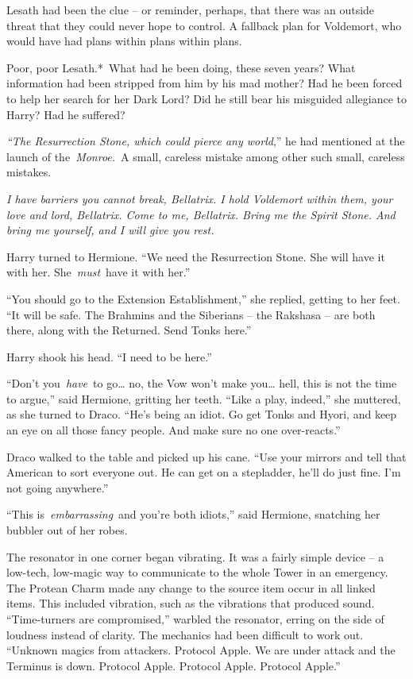Lesath had been the clue -- or reminder, perhaps, that there was an
outside threat that they could never hope to control. A fallback plan
for Voldemort, who would have had plans within plans within plans.

Poor, poor Lesath.*~What had he been doing, these seven years? What
information had been stripped from him by his mad mother? Had he been
forced to help her search for her Dark Lord? Did he still bear his
misguided allegiance to Harry? Had he suffered?

\emph{``The Resurrection Stone, which could pierce any world},'' he had
mentioned at the launch of the~\emph{Monroe.}~A small, careless mistake
among other such small, careless mistakes.

\emph{I have barriers you cannot break, Bellatrix. I hold Voldemort
within them, your love and lord, Bellatrix. Come to me, Bellatrix. Bring
me the Spirit Stone. And bring me yourself, and I will give you rest.}

Harry turned to Hermione. ``We need the Resurrection Stone. She will
have it with her. She~\emph{must}~have it with her.''

``You should go to the Extension Establishment,'' she replied, getting
to her feet. ``It will be safe. The Brahmins and the Siberians -- the
Rakshasa -- are both there, along with the Returned. Send Tonks here.''

Harry shook his head. ``I need to be here.''

``Don't you~\emph{have}~to go\ldots{} no, the Vow won't make you\ldots{}
hell, this is not the time to argue,'' said Hermione, gritting her
teeth. ``Like a play, indeed,'' she muttered, as she turned to Draco.
``He's being an idiot. Go get Tonks and Hyori, and keep an eye on all
those fancy people. And make sure no one over-reacts.''

Draco walked to the table and picked up his cane. ``Use your mirrors and
tell that American to sort everyone out. He can get on a stepladder,
he'll do just fine. I'm not going anywhere.''

``This is~\emph{embarrassing}~and you're both idiots,'' said Hermione,
snatching her bubbler out of her robes.

The resonator in one corner began vibrating. It was a fairly simple
device -- a low-tech, low-magic way to communicate to the whole Tower in
an emergency. The Protean Charm made any change to the source item occur
in all linked items. This included vibration, such as the vibrations
that produced sound. ``Time-turners are compromised,'' warbled the
resonator, erring on the side of loudness instead of clarity. The
mechanics had been difficult to work out. ``Unknown magics from
attackers. Protocol Apple. We are under attack and the Terminus is down.
Protocol Apple. Protocol Apple. Protocol Apple.''

